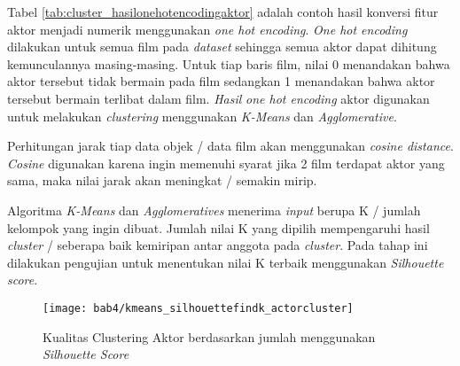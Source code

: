 \begin{table}[H]
\centering
\caption{ Contoh Hasil One Hot Encoding Aktor}
\label{tab:cluster_hasilonehotencodingaktor}
\end{table}

Tabel \ref{tab:cluster_hasilonehotencodingaktor} adalah contoh hasil konversi fitur aktor menjadi numerik menggunakan \textit{one hot encoding}. \textit{One hot encoding} dilakukan untuk semua film pada \textit{dataset} sehingga semua aktor dapat dihitung kemunculannya masing-masing. Untuk tiap baris film, nilai 0 menandakan bahwa aktor tersebut tidak bermain pada film sedangkan 1 menandakan bahwa aktor tersebut bermain terlibat dalam film. \textit{Hasil} \textit{one hot encoding} aktor digunakan untuk melakukan \textit{clustering} menggunakan \textit{K-Means} dan \textit{Agglomerative}. 

Perhitungan jarak tiap data objek / data film akan menggunakan \textit{cosine distance}. \textit{Cosine} digunakan karena ingin memenuhi syarat jika 2 film terdapat aktor yang sama, maka nilai jarak akan meningkat / semakin mirip. 

Algoritma \textit{K-Means} dan \textit{Agglomeratives} menerima \textit{input} berupa K / jumlah kelompok yang ingin dibuat. Jumlah nilai K yang dipilih mempengaruhi hasil \textit{cluster} / seberapa baik kemiripan antar anggota pada \textit{cluster}. Pada tahap ini dilakukan pengujian untuk menentukan nilai K terbaik menggunakan \textit{Silhouette score}. 


\begin{figure}[H]
	\centering  
	\texttt{[image: bab4/kmeans\_silhouettefindk\_actorcluster]}   
	\caption{Kualitas Clustering Aktor berdasarkan jumlah menggunakan \textit{Silhouette Score} }	\label{fig:kmeans_silhouettefindk_actorcluster} 
\end{figure}


